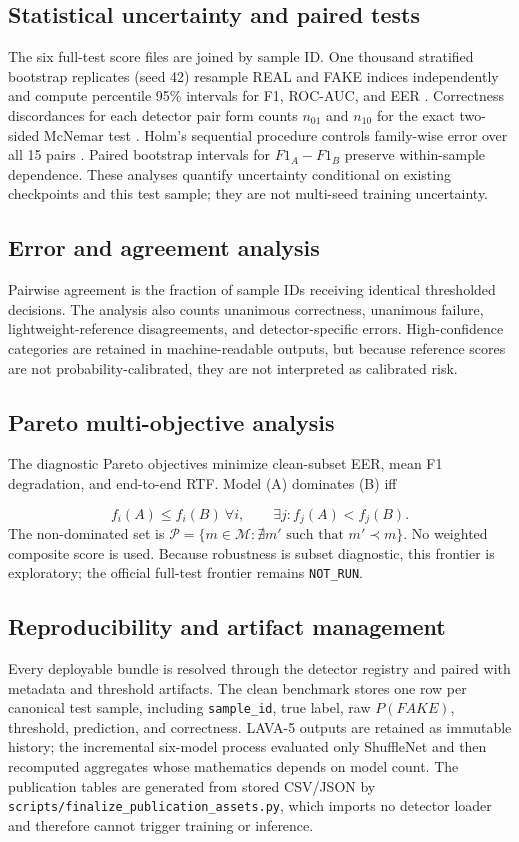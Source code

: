\documentclass[10pt,journal]{IEEEtran}
\begin{document}
\subsection{Statistical uncertainty and paired tests}
The six full-test score files are joined by sample ID. One thousand stratified bootstrap replicates (seed 42) resample REAL and FAKE indices independently and compute percentile 95\% intervals for F1, ROC-AUC, and EER \cite{efron1979bootstrap}. Correctness discordances for each detector pair form counts $n_{01}$ and $n_{10}$ for the exact two-sided McNemar test \cite{mcnemar1947}. Holm's sequential procedure controls family-wise error over all 15 pairs \cite{holm1979}. Paired bootstrap intervals for $F1_A-F1_B$ preserve within-sample dependence. These analyses quantify uncertainty conditional on existing checkpoints and this test sample; they are not multi-seed training uncertainty.

\subsection{Error and agreement analysis}
Pairwise agreement is the fraction of sample IDs receiving identical thresholded decisions. The analysis also counts unanimous correctness, unanimous failure, lightweight-reference disagreements, and detector-specific errors. High-confidence categories are retained in machine-readable outputs, but because reference scores are not probability-calibrated, they are not interpreted as calibrated risk.

\subsection{Pareto multi-objective analysis}
The diagnostic Pareto objectives minimize clean-subset EER, mean F1 degradation, and end-to-end RTF. Model (A) dominates (B) iff

\begin{equation}
f_i(A)\le f_i(B)\ \forall i,\qquad \exists j:f_j(A)<f_j(B).
\end{equation}
The non-dominated set is $\mathcal{P}=\{m\in\mathcal{M}:\nexists m'\text{ such that }m'\prec m\}$. No weighted composite score is used. Because robustness is subset diagnostic, this frontier is exploratory; the official full-test frontier remains \texttt{NOT\_RUN}.

\subsection{Reproducibility and artifact management}
Every deployable bundle is resolved through the detector registry and paired with metadata and threshold artifacts. The clean benchmark stores one row per canonical test sample, including \texttt{sample\_id}, true label, raw $P(FAKE)$, threshold, prediction, and correctness. LAVA-5 outputs are retained as immutable history; the incremental six-model process evaluated only ShuffleNet and then recomputed aggregates whose mathematics depends on model count. The publication tables are generated from stored CSV/JSON by \texttt{scripts/finalize\_publication\_assets.py}, which imports no detector loader and therefore cannot trigger training or inference.
\end{document}
